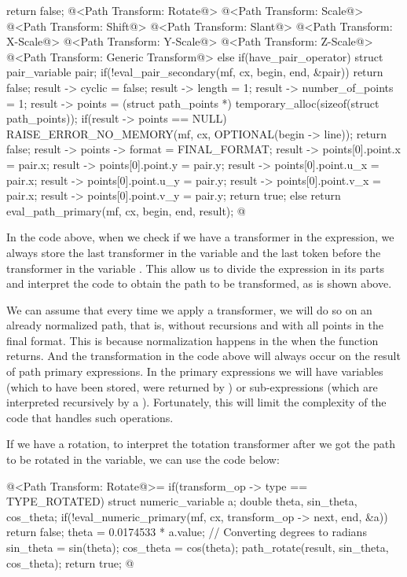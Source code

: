 {{{{{{{      return false;
    @<Path Transform: Rotate@>
    @<Path Transform: Scale@>
    @<Path Transform: Shift@>
    @<Path Transform: Slant@>
    @<Path Transform: X-Scale@>
    @<Path Transform: Y-Scale@>
    @<Path Transform: Z-Scale@>
    @<Path Transform: Generic Transform@>
  }
  else if(have_pair_operator){
    struct pair_variable pair;
    if(!eval_pair_secondary(mf, cx, begin, end, &pair))
      return false;
    result -> cyclic = false;
    result -> length = 1;
    result -> number_of_points = 1;
    result -> points = (struct path_points *)
                         temporary_alloc(sizeof(struct path_points));
    if(result -> points == NULL){
      RAISE_ERROR_NO_MEMORY(mf, cx, OPTIONAL(begin -> line));
      return false;
    }
    result -> points -> format = FINAL_FORMAT;
    result -> points[0].point.x = pair.x;
    result -> points[0].point.y = pair.y;
    result -> points[0].point.u_x = pair.x;
    result -> points[0].point.u_y = pair.y;
    result -> points[0].point.v_x = pair.x;
    result -> points[0].point.v_y = pair.y;
    return true;    
  }
  else
    return eval_path_primary(mf, cx, begin, end, result);
}
@
\fimcodigo

In the code above, when we check if we have a transformer in the
expression, we always store the last transformer in the
variable  and the last token before the
transformer in the variable . This allow
us to divide the expression in its parts and interpret the code to
obtain the path to be transformed, as is shown above.

We can assume that every time we apply a transformer, we will do so on
an already normalized path, that is, without recursions and with all
points in the final format. This is because normalization happens in
the when the  function returns. And
the transformation in the code above will always occur on the result
of path primary expressions. In the primary expressions we will have
variables (which to have been stored, were returned by
) or sub-expressions (which are
interpreted recursively by
a ). Fortunately, this will limit
the complexity of the code that handles such operations.

If we have a rotation, to interpret the totation transformer after we
got the path to be rotated in the  variable, we can
use the code below:

\iniciocodigo
@<Path Transform: Rotate@>=
if(transform_op -> type == TYPE_ROTATED){
  struct numeric_variable a;
  double theta, sin_theta, cos_theta;
  if(!eval_numeric_primary(mf, cx, transform_op -> next, end, &a))
    return false;
  theta = 0.0174533 * a.value; // Converting degrees to radians
  sin_theta = sin(theta);
  cos_theta = cos(theta);
  path_rotate(result, sin_theta, cos_theta);
  return true;
}
@
\fimcodigo

}}}}}
